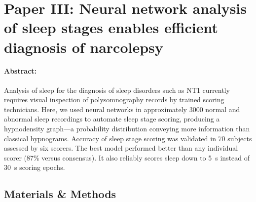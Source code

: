 \section{Paper III: Neural network analysis of sleep stages enables efficient diagnosis of narcolepsy}\label{sec:paperiii}

\begin{tcolorbox}[colframe=white]
\paragraph{Abstract:} Analysis of sleep for the diagnosis of sleep disorders such as \ac{NT1} currently requires visual inspection of polysomnography records by trained scoring technicians. 
Here, we used neural networks in approximately \num{3000} normal and abnormal sleep recordings to automate sleep stage scoring, producing a hypnodensity graph---a probability distribution conveying more information than classical hypnograms. 
Accuracy of sleep stage scoring was validated in 70 subjects assessed by six scorers. 
The best model performed better than any individual scorer (87\% versus consensus). 
It also reliably scores sleep down to \SI{5}{\second} instead of \SI{30}{\second} scoring epochs.
\end{tcolorbox}

\subsection{Materials \& Methods}

